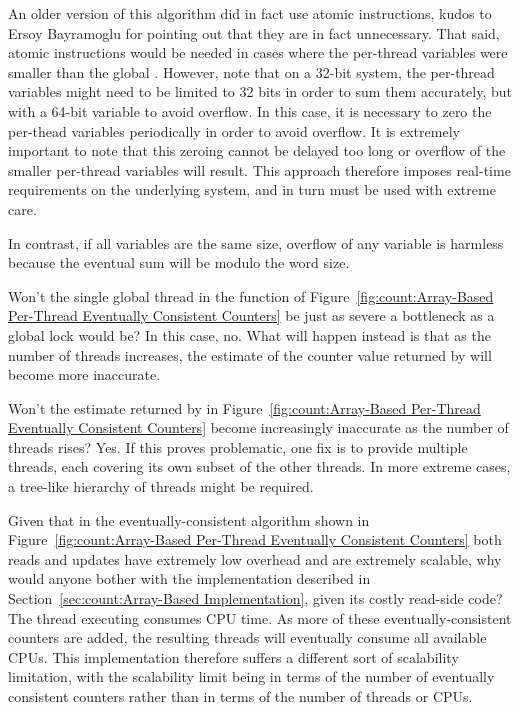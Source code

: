 	An older version of this algorithm did in fact use atomic
	instructions, kudos to Ersoy Bayramoglu for pointing out that
	they are in fact unnecessary.
	That said, atomic instructions would be needed in cases where
	the per-thread  variables were smaller than the
	global .
	However, note that on a 32-bit system,
	the per-thread  variables
	might need to be limited to 32 bits in order to sum them accurately,
	but with a 64-bit  variable to avoid overflow.
	In this case, it is necessary to zero the per-thead
	 variables periodically in order to avoid overflow.
	It is extremely important to note that this zeroing cannot
	be delayed too long or overflow of the smaller per-thread
	variables will result.
	This approach therefore imposes real-time requirements on the
	underlying system, and in turn must be used with extreme care.

	In contrast, if all variables are the same size, overflow
	of any variable is harmless because the eventual sum
	will be modulo the word size.

\QuickQ{}
	Won't the single global thread in the function  of
	Figure~\ref{fig:count:Array-Based Per-Thread Eventually Consistent Counters}
	be just as severe a bottleneck as a global lock would be?
\QuickA{}
	In this case, no.
	What will happen instead is that as the number of threads increases,
	the estimate of the counter
	value returned by  will become more inaccurate.

\QuickQ{}
	Won't the estimate returned by  in
	Figure~\ref{fig:count:Array-Based Per-Thread Eventually Consistent Counters}
	become increasingly
	inaccurate as the number of threads rises?
\QuickA{}
	Yes.
	If this proves problematic, one fix is to provide multiple
	 threads, each covering its own subset of
	the other threads.
	In more extreme cases, a tree-like hierarchy of
	 threads might be required.

\QuickQ{}
	Given that in the eventually-consistent algorithm shown in
	Figure~\ref{fig:count:Array-Based Per-Thread Eventually Consistent Counters}
	both reads and updates have extremely low overhead
	and are extremely scalable, why would anyone bother with the
	implementation described in
	Section~\ref{sec:count:Array-Based Implementation},
	given its costly read-side code?
\QuickA{}
	The thread executing  consumes CPU time.
	As more of these eventually-consistent counters are added,
	the resulting  threads will eventually
	consume all available CPUs.
	This implementation therefore suffers a different sort of
	scalability limitation, with the scalability limit being in
	terms of the number of eventually consistent counters rather
	than in terms of the number of threads or CPUs.

